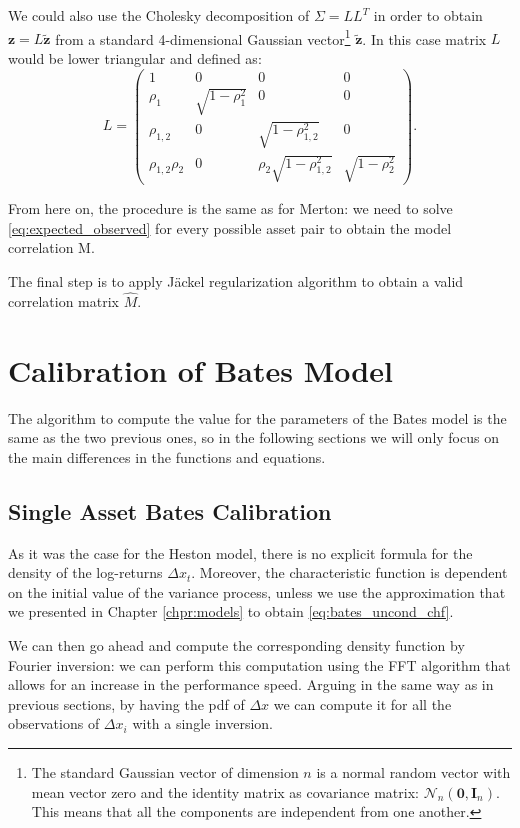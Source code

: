 We could also use the Cholesky decomposition of $\Sigma = L L^T$ in order to obtain $\mathbf{z} = L \mathbf{\tilde{z}}$ from a standard 4-dimensional Gaussian vector\footnote{The standard Gaussian vector of dimension $n$ is a normal random vector with mean vector zero and the identity matrix as covariance matrix: $\mathcal{N}_n (\mathbf{0}, \mathbf{I}_n)$. This means that all the components are independent from one another.} $\mathbf{\tilde{z}}$. In this case matrix $L$ would be lower triangular and defined as:
\begin{equation}
	L = \begin{pmatrix}
	1&0&0&0\\
	\rho_1 & \sqrt{1- \rho_1^2} &0&0\\
	\rho_{1,2} &0&\sqrt{1-\rho_{1,2}^2}&0\\
	\rho_{1,2}\rho_2 & 0& \rho_2 \sqrt{1-\rho_{1,2}^2}&\sqrt{1- \rho_2^2} 
	\end{pmatrix}.
\end{equation}

From here on, the procedure is the same as for Merton:
we need to solve \eqref{eq:expected_observed} for every possible asset pair to obtain the model correlation M.

The final step is to apply  J\"ackel regularization algorithm to obtain a valid correlation matrix $\widehat{M}$.

\bigskip
\section{Calibration of Bates Model}
\label{sec:bates_cal}
The algorithm to compute the value for the parameters of the Bates model is the same as the two previous ones, so in the following sections we will only focus on the main differences in the functions and equations.

\subsection{Single Asset Bates Calibration}
As it was the case for the Heston model, there is no explicit formula for the density of the log-returns $\Delta x_t$. Moreover, the characteristic function is dependent on the initial value of the variance process, unless we use the approximation that we presented in Chapter \ref{chpr:models} to obtain \eqref{eq:bates_uncond_chf}.

We can then go ahead and compute the corresponding density function by Fourier inversion: we can perform this computation using the FFT algorithm that allows for an increase in the performance speed. 
Arguing in the same way as in previous sections, by having the pdf of $\Delta x$ we can compute it for all the observations of $\Delta x_i$ with a single inversion.

